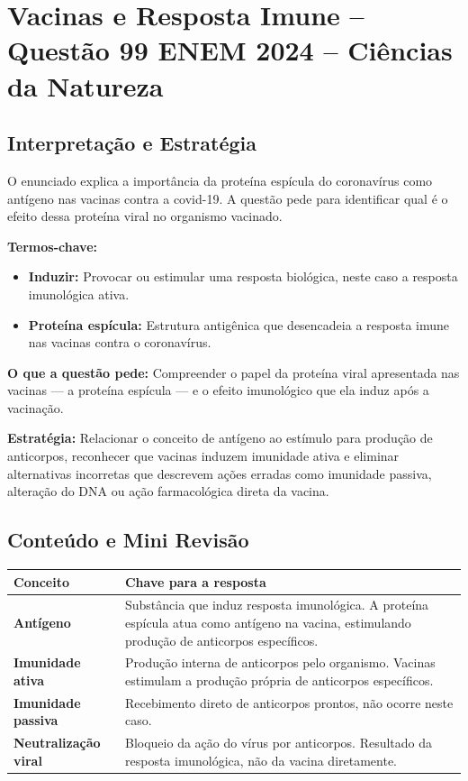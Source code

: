 \documentclass{article}
\begin{document}
\section*{Vacinas e Resposta Imune – Questão 99 ENEM 2024 – Ciências da Natureza}

\subsection*{Interpretação e Estratégia}

O enunciado explica a importância da proteína espícula do coronavírus como antígeno nas vacinas contra a covid-19. A questão pede para identificar qual é o efeito dessa proteína viral no organismo vacinado.

\textbf{Termos-chave:}
\begin{itemize}
  \item \textbf{Induzir:} Provocar ou estimular uma resposta biológica, neste caso a resposta imunológica ativa.
  \item \textbf{Proteína espícula:} Estrutura antigênica que desencadeia a resposta imune nas vacinas contra o coronavírus.
\end{itemize}

\textbf{O que a questão pede:} Compreender o papel da proteína viral apresentada nas vacinas — a proteína espícula — e o efeito imunológico que ela induz após a vacinação.

\textbf{Estratégia:} Relacionar o conceito de antígeno ao estímulo para produção de anticorpos, reconhecer que vacinas induzem imunidade ativa e eliminar alternativas incorretas que descrevem ações erradas como imunidade passiva, alteração do DNA ou ação farmacológica direta da vacina.

\subsection*{Conteúdo e Mini Revisão}

\begin{center}
\begin{tabular}{|l|p{9cm}|}
\hline
\textbf{Conceito} & \textbf{Chave para a resposta} \\ \hline
\textbf{Antígeno} & Substância que induz resposta imunológica. A proteína espícula atua como antígeno na vacina, estimulando produção de anticorpos específicos. \\ \hline
\textbf{Imunidade ativa} & Produção interna de anticorpos pelo organismo. Vacinas estimulam a produção própria de anticorpos específicos. \\ \hline
\textbf{Imunidade passiva} & Recebimento direto de anticorpos prontos, não ocorre neste caso. \\ \hline
\textbf{Neutralização viral} & Bloqueio da ação do vírus por anticorpos. Resultado da resposta imunológica, não da vacina diretamente. \\ \hline
\end{tabular}
\end{center}
\end{document}
